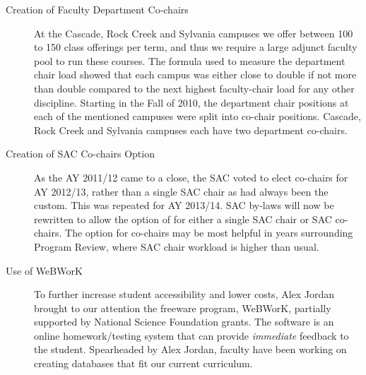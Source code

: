 \begin{description}
  \item[Creation of Faculty Department Co-chairs] At the Cascade, Rock Creek and Sylvania campuses we
    offer between 100 to 150 class offerings per term, and
    thus we require a large adjunct faculty pool to run these courses.    The
    formula used to measure the department chair load showed that each campus
    was either close to double if not more than double compared to the next
    highest faculty-chair load for any other discipline.   Starting in the Fall
    of 2010, the department chair positions at each of the mentioned campuses
    were split into co-chair positions.   Cascade, Rock Creek and Sylvania
    campuses each have two department co-chairs.
  \item[Creation of SAC Co-chairs Option] As the AY 2011/12 came to a close, the SAC voted to elect 
    co-chairs for AY 2012/13, rather than a single SAC chair as had always been the custom.
    This was repeated for AY 2013/14. SAC by-laws will now be rewritten to allow the option of for either
    a single SAC chair or SAC co-chairs. The option for co-chairs may be most helpful in years surrounding
    Program Review, where SAC chair workload is higher than usual.
  \item[Use of WeBWorK] To further increase student accessibility and lower costs,
Alex Jordan brought to our attention the freeware program,
    WeBWorK,  partially supported by  National Science Foundation grants.    The
    software is an online homework/testing
    system that can provide \emph{immediate} feedback to the student.   Spearheaded by Alex
    Jordan, faculty have been working on creating databases that fit our current
    curriculum. 
    

\end{description}
